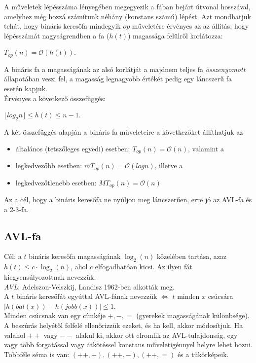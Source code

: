 \documentclass[12pt,margin=0px]{article}
\begin{document}
    A műveletek lépésszáma lényegében megegyezik a fában bejárt útvonal hosszával, amelyhez még hozzá számítunk néhány (konstans számú) lépést.
    Azt mondhatjuk tehát, hogy bináris keresőfa mindegyik $op$ műveletére érvényes az az állítás, hogy lépésszámát nagyságrendben a fa ($h(t)$) magassága felülről korlátozza:
    \begin{center}
        $T_{op}(n) = \mathcal{O}(h(t)) $.
    \end{center}

    A bináris fa a magasságának az alsó korlátját a majdnem teljes fa \emph{összenyomott} állapotában veszi fel, a magasság legnagyobb értékét pedig egy láncszerű fa esetén kapjuk.\\ Érvényes a következő összefüggés:
    \begin{center}
        $\lfloor log_2n \rfloor \leq h(t) \leq n - 1$.\\
    \end{center}

    \noindent A két összefüggés alapján a bináris fa műveleteire a következőket állíthatjuk az
    \begin{itemize}
        \item általános (tetszőleges egyedi) esetben: $T_{op}(n) = \mathcal{O}(n)$, valamint a
        \item legkedvezőbb esetben: $mT_{op}(n) = \mathcal{O}(log n)$, illetve a
        \item legkedvezőtlenebb esetben: $MT_{op}(n) = \mathcal{O}(n)$
    \end{itemize}

	\noindent Az a cél, hogy a bináris keresőfa ne nyúljon meg láncszerűen, erre jó az AVL-fa és a 2-3-fa.
	
	\subsection*{AVL-fa}
	
	Cél: a $t$ bináris keresőfa magasságának $\log_2(n)$ közelében tartása, azaz $h(t) \leq c \cdot \log_2(n)$, ahol $c$ elfogadhatóan kicsi. Az ilyen fát kiegyensúlyozottnak nevezzük. \\
	\textit{AVL}: Adelszon-Velszkij, Landisz 1962-ben alkották meg. \\
	A $t$ bináris keresőfát egyúttal AVL-fának nevezzük $\Longleftrightarrow$ $t$ minden $x$ csúcsára $|h(bal(x))-h(jobb(x))| \leq 1$. \\
	Minden csúcsnak van egy címkéje $+,-,=$ (gyerekek magasságának különbsége). A beszúrás helyétől felfelé ellenőrizzük ezeket, és ha kell, akkor módosítjuk. Ha valahol $++$ vagy $--$ alakul ki, akkor ott elromlik az AVL-tulajdonság, egy vagy több forgatással vagy átkötéssel konstans műveletigénnyel helyre lehet hozni. \\
	Többféle séma is van: $(++,+), (++,-), (++,=)$ és a tükörképeik.
	
\end{document}
